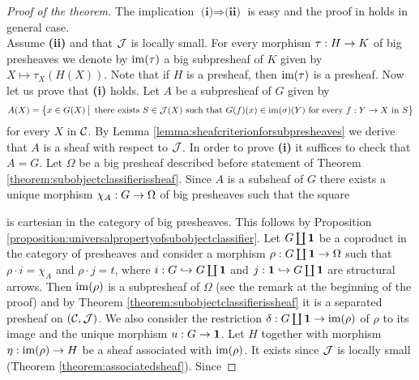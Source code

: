\begin{proof}[Proof of the theorem]
The implication $\textbf{(i)}\Rightarrow \textbf{(ii)}$ is easy and the proof in {\cite[page 143, Corollary 5]{maclane1994sheaves}} holds in general case.\\
Assume \textbf{(ii)} and that ${\mathcal J}$ is locally small. For every morphism $\tau:H\rightarrow K$ of big presheaves we denote by $\mathrm{im}(\tau)$ a big subpresheaf of $K$ given by $X\mapsto \tau_X\left(H(X)\right)$. Note that if $H$ is a presheaf, then $\mathrm{im}(\tau)$ is a presheaf. Now let us prove that \textbf{(i)} holds. Let $A$ be a subpresheaf of $G$ given by
$$A(X) = \big\{x\in G(X)\,\big|\,\mbox{ there exists }S\in {\mathcal J}(X)\mbox{ such that }G(f)(x)\in \mathrm{im}(\sigma)(Y)\mbox{ for every }f:Y\rightarrow X\mbox{ in } S\big\}$$
for every $X$ in ${\mathcal C}$. By Lemma \ref{lemma:sheafcriterionforsubpresheaves} we derive that $A$ is a sheaf with respect to ${\mathcal J}$. In order to prove \textbf{(i)} it suffices to check that $A = G$. Let $\Omega$ be a big presheaf described before statement of Theorem \ref{theorem:subobjectclassifierissheaf}. Since $A$ is a subsheaf of $G$ there exists a unique morphism $\chi_A:G\rightarrow \Omega$ of big presheaves such that the square
\begin{center}
\end{center}
is cartesian in the category of big presheaves. This follows by Proposition \ref{proposition:universalpropertyofsubobjectclassifier}. Let $G\coprod \mathbf{1}$ be a coproduct in the category of presheaves and consider a morphism $\rho:G\coprod \mathbf{1}\rightarrow \Omega$ such that $\rho\cdot i = \chi_A$ and $\rho\cdot j = t$, where $i:G\hookrightarrow G\coprod \mathbf{1}$ and $j:\mathbf{1}\hookrightarrow G\coprod \mathbf{1}$ are structural arrows. Then $\mathrm{im}(\rho)$ is a subpresheaf of $\Omega$ (see the remark at the beginning of the proof) and by Theorem \ref{theorem:subobjectclassifierissheaf} it is a separated presheaf on $({\mathcal C},{\mathcal J})$. We also consider the restriction $\delta:G\coprod \mathbf{1}\rightarrow \mathrm{im}(\rho)$ of $\rho$ to its image and the unique morphism $u:G\rightarrow \mathbf{1}$. Let $H$ together with morphism $\eta:\mathrm{im}(\rho)\rightarrow H$ be a sheaf associated with $\mathrm{im}(\rho)$. It exists since ${\mathcal J}$ is locally small (Theorem \ref{theorem:associatedsheaf}). Since

\end{proof}
